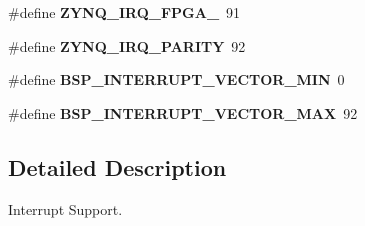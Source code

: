 \begin{DoxyCompactItemize}
\#define {\bfseries Z\+Y\+N\+Q\+\_\+\+I\+R\+Q\+\_\+\+F\+P\+G\+A\+\_}~91
\item 
\mbox{\label{group__zynq__interrupt_gadb435ac002cbf8be68a2a17f66dea3b5}} 
\#define {\bfseries Z\+Y\+N\+Q\+\_\+\+I\+R\+Q\+\_\+\+P\+A\+R\+I\+TY}~92
\item 
\mbox{\label{group__zynq__interrupt_ga64cbb02dfea4d6923abccaa0087d2a0d}} 
\#define {\bfseries B\+S\+P\+\_\+\+I\+N\+T\+E\+R\+R\+U\+P\+T\+\_\+\+V\+E\+C\+T\+O\+R\+\_\+\+M\+IN}~0
\item 
\mbox{\label{group__zynq__interrupt_gae4a2cdda5816a4c83c2fac0a49880c6e}} 
\#define {\bfseries B\+S\+P\+\_\+\+I\+N\+T\+E\+R\+R\+U\+P\+T\+\_\+\+V\+E\+C\+T\+O\+R\+\_\+\+M\+AX}~92
\end{DoxyCompactItemize}


\subsection{Detailed Description}
Interrupt Support. 

